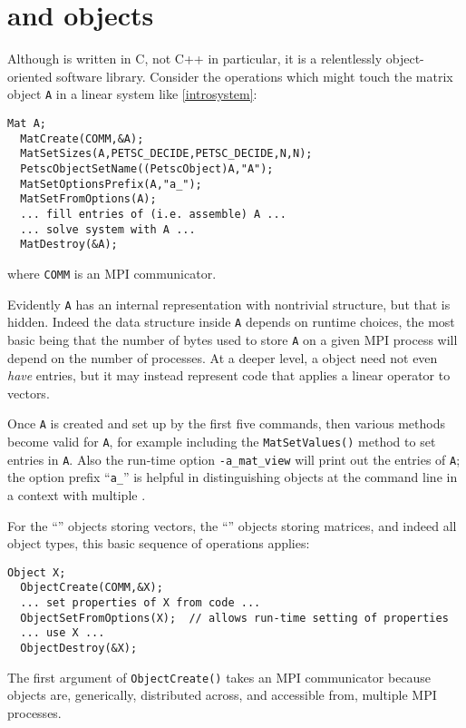 \section{\PETSc \pVec and \pMat objects}

Although \PETSc is written in C, not C++ in particular, it is a relentlessly object-oriented software library.  Consider the operations which might touch the matrix object \texttt{A} in a linear system like \eqref{introsystem}:
\begin{Verbatim}[fontsize=\small]
  Mat A;
  MatCreate(COMM,&A);
  MatSetSizes(A,PETSC_DECIDE,PETSC_DECIDE,N,N);
  PetscObjectSetName((PetscObject)A,"A");
  MatSetOptionsPrefix(A,"a_");
  MatSetFromOptions(A);
  ... fill entries of (i.e. assemble) A ...
  ... solve system with A ...
  MatDestroy(&A);
\end{Verbatim}
where \texttt{COMM} is an MPI communicator.

Evidently \texttt{A} has an internal representation with nontrivial structure, but that is hidden.  Indeed the data structure inside \texttt{A} depends on runtime choices, the most basic being that the number of bytes used to store \texttt{A} on a given MPI process will depend on the number of processes.  At a deeper level, a \PETSc \pMat object need not even \emph{have} entries, but it may instead represent code that applies a linear operator to vectors.

Once \texttt{A} is created and set up by the first five commands, then various methods become valid for \texttt{A}, for example including the \texttt{MatSetValues()} method to set entries in \texttt{A}.  Also the run-time option \texttt{-a\_mat\_view} will print out the entries of \texttt{A}; the option prefix ``\texttt{a\_}'' is helpful in distinguishing \pMat objects at the command line in a context with multiple \pMats.

For the ``\pVec'' objects storing vectors, the ``\pMat'' objects storing matrices, and indeed all \PETSc object types, this basic sequence of operations applies:
\begin{Verbatim}[fontsize=\small]
  Object X;
  ObjectCreate(COMM,&X);
  ... set properties of X from code ...
  ObjectSetFromOptions(X);  // allows run-time setting of properties
  ... use X ...
  ObjectDestroy(&X);
\end{Verbatim}
The first argument of \texttt{ObjectCreate()} takes an MPI communicator because \PETSc objects are, generically, distributed across, and accessible from, multiple MPI processes. 

